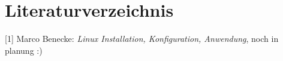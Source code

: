 
\chapter{Literaturverzeichnis}
\begin{description}
\item{[1]}
Marco Benecke: \textit{Linux Installation, Konfiguration, Anwendung},
noch in planung :)

\end{description}




